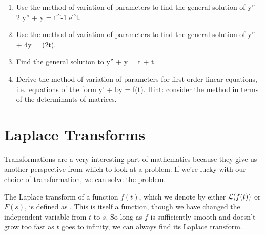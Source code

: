 \documentclass[12pt]{book}
\begin{document}
\begin{enumerate}

\item Use the method of variation of parameters to find the general solution of
  \bee
  y'' - 2 y'' + y = t^{-1} e^t.
  \eee

\item Use the method of variation of parameters to find the general solution of
  \bee
  y'' + 4y = \sin(2t).
  \eee

\item
  Find the general solution to
  \bee
  y'' + y = \tan t + t.
  \eee

\item
  Derive the method of variation of parameters for first-order linear
  equations, i.e.\ equations of the form
  \bee
  y' + by = f(t).
  \eee
  Hint: consider the method in terms of the determinants of matrices.

\end{enumerate}


\chapter{Laplace Transforms}

Transformations are a very interesting part of mathematics because they give us
another perspective from which to look at a problem. If we're lucky with
our choice of transformation, we can solve the problem.

The Laplace transform of a function $f(t)$, which we denote by either
$\mathcal{L}(f(t))$ or $F(s)$, is defined as
\be
{}.
\ee
This is itself a function, though we have changed the independent variable
from $t$ to $s$. So long as $f$ is sufficiently smooth and doesn't grow too
fast as $t$ goes to infinity, we can always find its Laplace transform.\\
\end{document}
